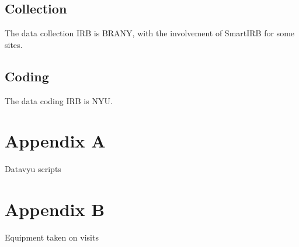 \documentclass[
  12pt,
]{book}
\begin{document}
\hypertarget{collection}{%
\section{Collection}\label{collection}}

The data collection IRB is BRANY, with the involvement of SmartIRB for some sites.

\hypertarget{coding}{%
\section{Coding}\label{coding}}

The data coding IRB is NYU.

\hypertarget{appendix-appendix}{%
\appendix}


\hypertarget{appendix-a}{%
\chapter{Appendix A}\label{appendix-a}}

Datavyu scripts

\hypertarget{appendix-b}{%
\chapter{Appendix B}\label{appendix-b}}

Equipment taken on visits

  
\end{document}
